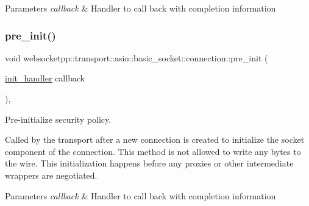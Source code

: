 \begin{DoxyParams}{Parameters}
{\em callback} & Handler to call back with completion information \\
\hline
\end{DoxyParams}
\mbox{\label{classwebsocketpp_1_1transport_1_1asio_1_1basic__socket_1_1connection_ab49994bd223b8d0a2eaa11d0029a1b78}} 
\subsubsection{\texorpdfstring{pre\+\_\+init()}{pre\_init()}}
{\footnotesize\ttfamily void websocketpp\+::transport\+::asio\+::basic\+\_\+socket\+::connection\+::pre\+\_\+init (\begin{DoxyParamCaption}\item[{\mbox{\hyperlink{namespacewebsocketpp_1_1transport_aeae75e675c1a334b3b33ab7120b480a5}{init\+\_\+handler}}}]{callback }\end{DoxyParamCaption})\hspace{0.3cm}{\ttfamily [inline]}, {\ttfamily [protected]}}



Pre-\/initialize security policy. 

Called by the transport after a new connection is created to initialize the socket component of the connection. This method is not allowed to write any bytes to the wire. This initialization happens before any proxies or other intermediate wrappers are negotiated.


\begin{DoxyParams}{Parameters}
{\em callback} & Handler to call back with completion information \\
\hline
\end{DoxyParams}
\mbox{\label{classwebsocketpp_1_1transport_1_1asio_1_1basic__socket_1_1connection_aac8318bcf892664a4f66a1f1435ed5ce}} 
